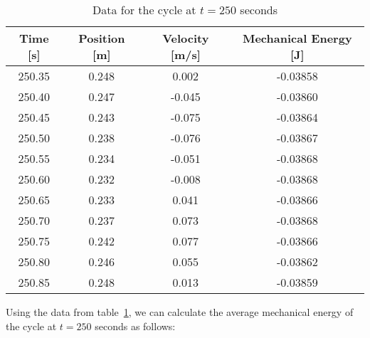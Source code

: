 \documentclass{article}
\begin{document}
            \begin{table}[H]
                \centering
                \begin{tabular}{|c|c|c|c|}
                    \hline
                    Time [s] & Position [m] & Velocity [m/s] & Mechanical Energy [J] \\
                    \hline
                    250.35   & 0.248        & 0.002          & -0.03858              \\
                    \hline
                    250.40   & 0.247        & -0.045         & -0.03860              \\
                    \hline
                    250.45   & 0.243        & -0.075         & -0.03864              \\
                    \hline
                    250.50   & 0.238        & -0.076         & -0.03867              \\
                    \hline
                    250.55   & 0.234        & -0.051         & -0.03868              \\
                    \hline
                    250.60   & 0.232        & -0.008         & -0.03868              \\
                    \hline
                    250.65   & 0.233        & 0.041          & -0.03866              \\
                    \hline
                    250.70   & 0.237        & 0.073          & -0.03868              \\
                    \hline
                    250.75   & 0.242        & 0.077          & -0.03866              \\
                    \hline
                    250.80   & 0.246        & 0.055          & -0.03862              \\
                    \hline
                    250.85   & 0.248        & 0.013          & -0.03859              \\
                    \hline
                \end{tabular} %
                \caption{Data for the cycle at $t=250$ seconds}\label{tab:cycle-at-250-seconds-mechanical-energy-table}
            \end{table}
            
            Using the data from table~\ref{tab:cycle-at-250-seconds-mechanical-energy-table}, we can calculate the average mechanical energy of the cycle at $t=250$ seconds as follows:
            
\end{document}
